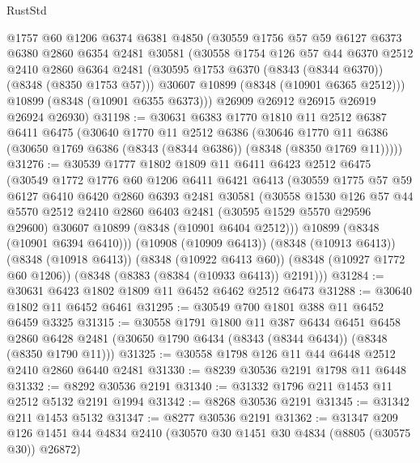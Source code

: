 \begin{lexlean}{RustStd}
\begin{coremodule}
      @1757
      @60
      @1206
      @6374
      @6381
      @4850
      (@30559
        @1756
        @57
        @59
        @6127
        @6373
        @6380
        @2860
        @6354
        @2481
        @30581
        (@30558
          @1754
          @126
          @57
          @44
          @6370
          @2512
          @2410
          @2860
          @6364
          @2481
          (@30595 @1753 @6370 (@8343 (@8344 @6370)) (@8348 (@8350 @1753 @57)))
          @30607
          @10899
          (@8348 (@10901 @6365 @2512)))
        @10899
        (@8348 (@10901 @6355 @6373)))
      @26909
      @26912
      @26915
      @26919
      @26924
      @26930)
@31198 := @30631
    @6383
    @1770
    @1810
    @11
    @2512
    @6387
    @6411
    @6475
    (@30640
      @1770
      @11
      @2512
      @6386
      (@30646 @1770 @11 @6386 (@30650 @1769 @6386 (@8343 (@8344 @6386)) (@8348 (@8350 @1769 @11)))))
@31276 := @30539
    @1777
    @1802
    @1809
    @11
    @6411
    @6423
    @2512
    @6475
    (@30549
      @1772
      @1776
      @60
      @1206
      @6411
      @6421
      @6413
      (@30559
        @1775
        @57
        @59
        @6127
        @6410
        @6420
        @2860
        @6393
        @2481
        @30581
        (@30558
          @1530
          @126
          @57
          @44
          @5570
          @2512
          @2410
          @2860
          @6403
          @2481
          (@30595 @1529 @5570 @29596 @29600)
          @30607
          @10899
          (@8348 (@10901 @6404 @2512)))
        @10899
        (@8348 (@10901 @6394 @6410)))
      (@10908 (@10909 @6413))
      (@8348 (@10913 @6413))
      (@8348 (@10918 @6413))
      (@8348 (@10922 @6413 @60))
      (@8348 (@10927 @1772 @60 @1206))
      (@8348 (@8383 (@8384 (@10933 @6413)) @2191)))
@31284 := @30631 @6423 @1802 @1809 @11 @6452 @6462 @2512 @6473
@31288 := @30640 @1802 @11 @6452 @6461
@31295 := @30549 @700 @1801 @388 @11 @6452 @6459 @3325
@31315 := @30558
    @1791
    @1800
    @11
    @387
    @6434
    @6451
    @6458
    @2860
    @6428
    @2481
    (@30650 @1790 @6434 (@8343 (@8344 @6434)) (@8348 (@8350 @1790 @11)))
@31325 := @30558 @1798 @126 @11 @44 @6448 @2512 @2410 @2860 @6440 @2481
@31330 := @8239 @30536 @2191 @1798 @11 @6448
@31332 := @8292 @30536 @2191
@31340 := @31332 @1796 @211 @1453 @11 @2512 @5132 @2191 @1994
@31342 := @8268 @30536 @2191
@31345 := @31342 @211 @1453 @5132
@31347 := @8277 @30536 @2191
@31362 := @31347
    @209
    @126
    @1451
    @44
    @4834
    @2410
    (@30570 @30 @1451 @30 @4834 (@8805 (@30575 @30)) @26872)

\end{coremodule}
\end{lexlean}
